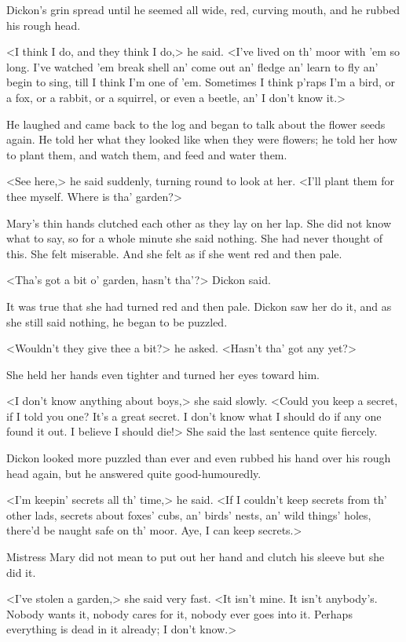 Dickon's grin spread until he seemed all wide, red, curving mouth, and he rubbed his rough head.

<I think I do, and they think I do,> he said. <I've lived on th' moor with 'em so long. I've watched 'em break shell an' come out an' fledge an' learn to fly an' begin to sing, till I think I'm one of 'em. Sometimes I think p'raps I'm a bird, or a fox, or a rabbit, or a squirrel, or even a beetle, an' I don't know it.>

He laughed and came back to the log and began to talk about the flower seeds again. He told her what they looked like when they were flowers; he told her how to plant them, and watch them, and feed and water them.

<See here,> he said suddenly, turning round to look at her. <I'll plant them for thee myself. Where is tha' garden?>

Mary's thin hands clutched each other as they lay on her lap. She did not know what to say, so for a whole minute she said nothing. She had never thought of this. She felt miserable. And she felt as if she went red and then pale.

<Tha's got a bit o' garden, hasn't tha'?> Dickon said.

It was true that she had turned red and then pale. Dickon saw her do it, and as she still said nothing, he began to be puzzled.

<Wouldn't they give thee a bit?> he asked. <Hasn't tha' got any yet?>

She held her hands even tighter and turned her eyes toward him.

<I don't know anything about boys,> she said slowly. <Could you keep a secret, if I told you one? It's a great secret. I don't know what I should do if any one found it out. I believe I should die!> She said the last sentence quite fiercely.

Dickon looked more puzzled than ever and even rubbed his hand over his rough head again, but he answered quite good-humouredly.

<I'm keepin' secrets all th' time,> he said. <If I couldn't keep secrets from th' other lads, secrets about foxes' cubs, an' birds' nests, an' wild things' holes, there'd be naught safe on th' moor. Aye, I can keep secrets.>

Mistress Mary did not mean to put out her hand and clutch his sleeve but she did it.

<I've stolen a garden,> she said very fast. <It isn't mine. It isn't anybody's. Nobody wants it, nobody cares for it, nobody ever goes into it. Perhaps everything is dead in it already; I don't know.>

